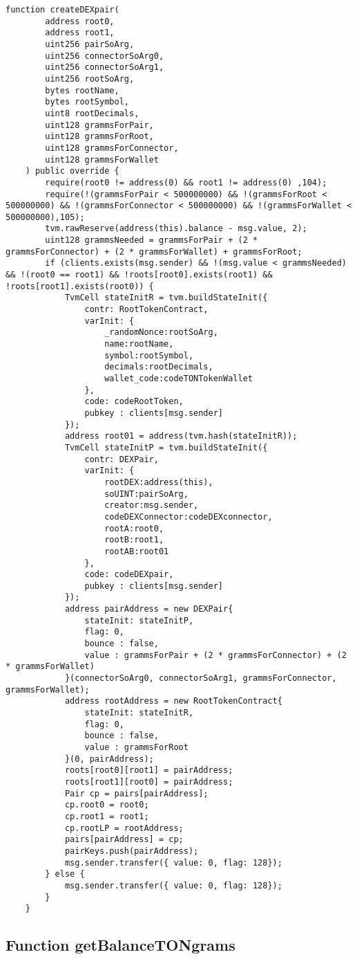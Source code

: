 \vspace{2cm}

\begin{lstlisting}[firstnumber=237]
	function createDEXpair(
		address root0,
		address root1,
		uint256 pairSoArg,
		uint256 connectorSoArg0,
		uint256 connectorSoArg1,
		uint256 rootSoArg,
		bytes rootName,
		bytes rootSymbol,
		uint8 rootDecimals,
		uint128 grammsForPair,
		uint128 grammsForRoot,
		uint128 grammsForConnector,
		uint128 grammsForWallet
	) public override {
		require(root0 != address(0) && root1 != address(0) ,104);
		require(!(grammsForPair < 500000000) && !(grammsForRoot < 500000000) && !(grammsForConnector < 500000000) && !(grammsForWallet < 500000000),105);
		tvm.rawReserve(address(this).balance - msg.value, 2);
		uint128 grammsNeeded = grammsForPair + (2 * grammsForConnector) + (2 * grammsForWallet) + grammsForRoot;
		if (clients.exists(msg.sender) && !(msg.value < grammsNeeded) && !(root0 == root1) && !roots[root0].exists(root1) && !roots[root1].exists(root0)) {
			TvmCell stateInitR = tvm.buildStateInit({
				contr: RootTokenContract,
				varInit: {
					_randomNonce:rootSoArg,
					name:rootName,
					symbol:rootSymbol,
					decimals:rootDecimals,
					wallet_code:codeTONTokenWallet
				},
				code: codeRootToken,
				pubkey : clients[msg.sender]
			});
			address root01 = address(tvm.hash(stateInitR));
			TvmCell stateInitP = tvm.buildStateInit({
				contr: DEXPair,
				varInit: {
					rootDEX:address(this),
					soUINT:pairSoArg,
					creator:msg.sender,
					codeDEXConnector:codeDEXconnector,
					rootA:root0,
					rootB:root1,
					rootAB:root01
				},
				code: codeDEXpair,
				pubkey : clients[msg.sender]
			});
			address pairAddress = new DEXPair{
				stateInit: stateInitP,
				flag: 0,
				bounce : false,
				value : grammsForPair + (2 * grammsForConnector) + (2 * grammsForWallet)
			}(connectorSoArg0, connectorSoArg1, grammsForConnector, grammsForWallet);
			address rootAddress = new RootTokenContract{
				stateInit: stateInitR,
				flag: 0,
				bounce : false,
				value : grammsForRoot
			}(0, pairAddress);
			roots[root0][root1] = pairAddress;
			roots[root1][root0] = pairAddress;
			Pair cp = pairs[pairAddress];
			cp.root0 = root0;
			cp.root1 = root1;
			cp.rootLP = rootAddress;
			pairs[pairAddress] = cp;
			pairKeys.push(pairAddress);
			msg.sender.transfer({ value: 0, flag: 128});
		} else {
			msg.sender.transfer({ value: 0, flag: 128});
		}
	}
\end{lstlisting}

\subsection{Function getBalanceTONgrams}


